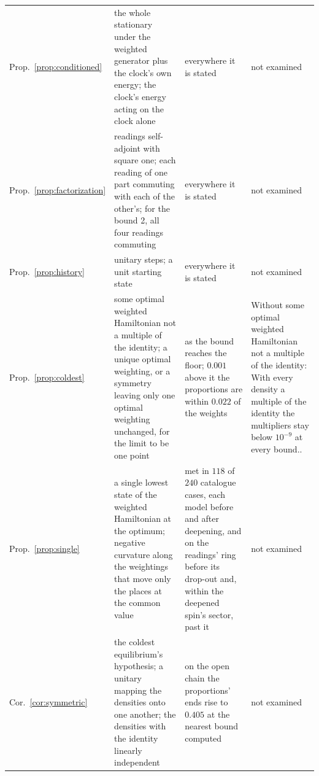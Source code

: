 \begin{tabular}{lp{1.75in}p{1.5in}p{2.25in}}
Prop.~\ref{prop:conditioned} & \raggedright the whole stationary under the weighted generator plus the clock's own energy; the clock's energy acting on the clock alone & \raggedright everywhere it is stated & \raggedright not examined \tabularnewline
Prop.~\ref{prop:factorization} & \raggedright readings self-adjoint with square one; each reading of one part commuting with each of the other's; for the bound 2, all four readings commuting & \raggedright everywhere it is stated & \raggedright not examined \tabularnewline
Prop.~\ref{prop:history} & \raggedright unitary steps; a unit starting state & \raggedright everywhere it is stated & \raggedright not examined \tabularnewline
Prop.~\ref{prop:coldest} & \raggedright some optimal weighted Hamiltonian not a multiple of the identity; a unique optimal weighting, or a symmetry leaving only one optimal weighting unchanged, for the limit to be one point & \raggedright as the bound reaches the floor; $0.001$ above it the proportions are within $0.022$ of the weights & \raggedright Without some optimal weighted Hamiltonian not a multiple of the identity: With every density a multiple of the identity the multipliers stay below $10^{-9}$ at every bound.. \tabularnewline
Prop.~\ref{prop:single} & \raggedright a single lowest state of the weighted Hamiltonian at the optimum; negative curvature along the weightings that move only the places at the common value & \raggedright met in $118$ of $240$ catalogue cases, each model before and after deepening, and on the readings' ring before its drop-out and, within the deepened spin's sector, past it & \raggedright not examined \tabularnewline
Cor.~\ref{cor:symmetric} & \raggedright the coldest equilibrium's hypothesis; a unitary mapping the densities onto one another; the densities with the identity linearly independent & \raggedright on the open chain the proportions' ends rise to $0.405$ at the nearest bound computed & \raggedright not examined \tabularnewline
\bottomrule
\end{tabular}

